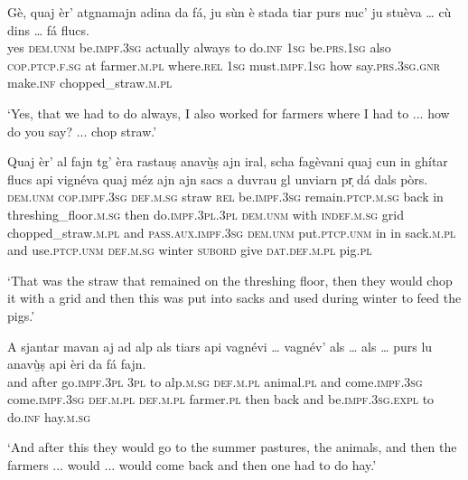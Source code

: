 \begin{linenumbers}
	\gll Gè, quaj èr’ atgnamajn adina da fá, ju sùn è stada tiar purs nuc’ ju stuèva … cù dins … fá flucs.\\
	yes \textsc{dem.unm} be.\textsc{impf.3sg} actually always to do.\textsc{inf} \textsc{1sg} be.\textsc{prs.1sg} also \textsc{cop.ptcp.f.sg} at farmer.\textsc{m.pl} where.\textsc{rel} \textsc{1sg} must.\textsc{impf.1sg} {} how say.\textsc{prs.3sg.gnr} {} make.\textsc{inf} chopped\_straw.\textsc{m.pl} \\
\end{linenumbers}
\medskip
\glt `Yes, that we had to do always, I also worked for farmers where I had to ... how do you say? ... chop straw.'
\medskip

\begin{linenumbers}
	\gll Quaj èr’ al fajn tg’ èra rastauṣ anavù̱ṣ ajn iral, scha fagèvani quaj cun in ghítar flucs api vignéva quaj méz ajn ajn sacs a duvrau gl unviarn pr̩ dá dals pòrs.\\
	\textsc{dem.unm} \textsc{cop.impf.3sg} \textsc{def.m.sg} straw \textsc{rel} be.\textsc{impf.3sg} remain.\textsc{ptcp.m.sg} back in threshing\_floor\textsc{.m.sg} then do.\textsc{impf.3pl.3pl} \textsc{dem.unm} with \textsc{indef.m.sg} grid chopped\_straw.\textsc{m.pl} and \textsc{pass.aux.impf.3sg} \textsc{dem.unm} put.\textsc{ptcp.unm} in in sack.\textsc{m.pl} and use.\textsc{ptcp.unm} \textsc{def.m.sg} winter \textsc{subord} give \textsc{dat.def.m.pl} pig.\textsc{pl}  \\
\end{linenumbers}
\medskip
\glt `That was the straw that remained on the threshing floor, then they would chop it with a grid and then this was put into sacks and used during winter to feed the pigs.'
\medskip

\begin{linenumbers}
	\gll A sjantar mavan aj ad alp als tiars api vagnévi … vagnév’  als … als … purs lu anavù̱ṣ api èri da fá fajn.\\
	and after go.\textsc{impf.3pl} \textsc{3pl} to alp.\textsc{m.sg} \textsc{def.m.pl} animal.\textsc{pl} and come.\textsc{impf.3sg} {} come.\textsc{impf.3sg} \textsc{def.m.pl} {} \textsc{def.m.pl} {} farmer.\textsc{pl} then back and be.\textsc{impf.3sg.expl} to do.\textsc{inf} hay.\textsc{m.sg}\\
\end{linenumbers}
\medskip
\glt `And after this they would go to the summer pastures, the animals, and then the farmers ... would ... would come back and then one had to do hay.'
\medskip

